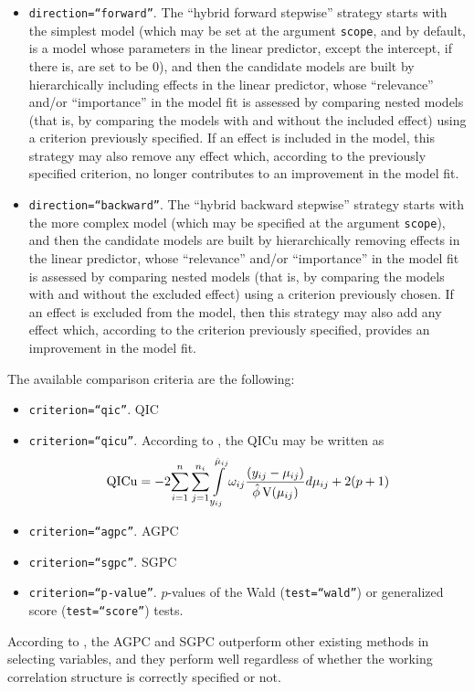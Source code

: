 \begin{itemize}
\item {\tt direction=``forward''}. The ``hybrid forward stepwise'' strategy starts with the simplest model (which may be set at the argument {\tt scope}, and by default, is a model whose parameters in the linear predictor, except the intercept, if there is, are set to be 0), and then the candidate models are built by hierarchically including effects in the linear predictor, whose ``relevance'' and/or ``importance'' in the model fit is assessed by comparing nested models (that is, by comparing the models with and without the included effect) using a criterion previously specified. If an effect is included in the model, this strategy may also remove any effect which, according to the previously specified criterion, no longer contributes to an improvement in the model fit.

\item {\tt direction=``backward''}. The ``hybrid backward stepwise'' strategy starts with the more complex model (which may be specified at the argument {\tt scope}), and then the candidate models are built by hierarchically removing effects in the linear predictor, whose ``relevance'' and/or ``importance'' in the model fit is assessed by comparing nested models (that is, by comparing the models with and without the excluded effect) using a criterion previously chosen. If an effect is excluded from the model, then this strategy may also add any effect which, according to the criterion previously specified, provides an improvement in the model fit.

\end{itemize}
The available comparison criteria are the following:
\begin{itemize}
\item {\tt criterion=``qic''}. QIC
\item {\tt criterion=``qicu''}. According to \cite{P01}, the QICu may be written as
$${\rm QICu}=-2\!\sum\limits_{i=1}^n\sum\limits_{j=1}^{n_i}\int\limits_{y_{ij}}^{\hat{\mu}_{ij}}\omega_{ij}\dfrac{(y_{ij}-\mu_{ij})}{\hat{\phi}\,{\rm V}(\mu_{ij})}d\mu_{ij}+2(p+1)$$
\item {\tt criterion=``agpc''}. AGPC
\item {\tt criterion=``sgpc''}. SGPC
\item {\tt criterion=``p-value''}. $p$-values of the Wald ({\tt test=``wald''}) or generalized score ({\tt test=``score''}) tests.
\end{itemize}
According to \cite{XZF19}, the AGPC and SGPC outperform other existing methods in selecting
variables, and they perform well regardless of whether the working correlation structure is correctly
specified or not.

